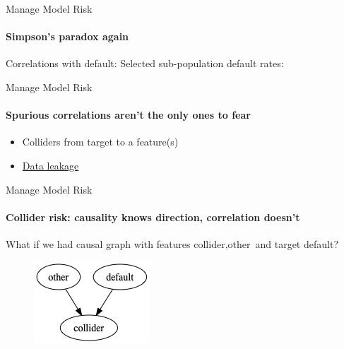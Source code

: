 \begin{frame}{Manage Model Risk}
    \framesubtitle{Simpson's paradox again}
    Correlations with default:
    \newline
    \newline
    \newline
    \newline
    Selected sub-population default rates:
    \newline
    \newline
    \newline

\end{frame}

\begin{frame}{Manage Model Risk}
    \framesubtitle{Spurious correlations aren't the only ones to fear}
    \begin{itemize}
        \item Colliders from target to a feature(s)
        \item \href{https://en.wikipedia.org/wiki/Leakage\_(machine\_learning)}{Data leakage}
    \end{itemize}

\end{frame}

\begin{frame}{Manage Model Risk}
    \framesubtitle{Collider risk: causality knows direction, correlation doesn't}
    What if we had causal graph with features \textrm{collider}$, \textrm{other}$ and target \textrm{default}?
    \newline
    \begin{figure}[ht]
        \includegraphics[height=0.5\textheight]{graphics/default_fork}
    \end{figure}
\end{frame}

